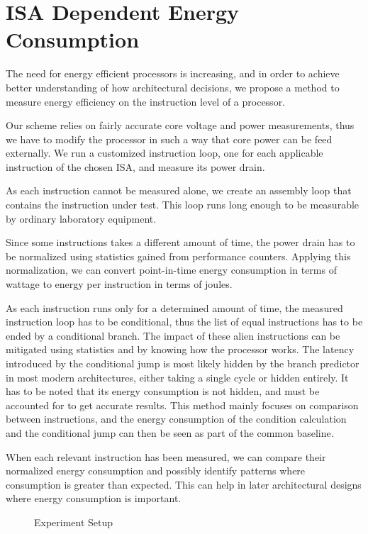 \section{ISA Dependent Energy Consumption}

The need for energy efficient processors is increasing, and in order to achieve
better understanding of how architectural decisions, we propose a method to
measure energy efficiency on the instruction level of a processor.

Our scheme relies on fairly accurate core voltage and power measurements, thus
we have to modify the processor in such a way that core power can be feed
externally.  We run a customized instruction loop, one for each applicable
instruction of the chosen ISA, and measure its power drain.

As each instruction cannot be measured alone, we create an assembly loop that
contains the instruction under test. This loop runs long enough to be measurable
by ordinary laboratory equipment.

Since some instructions takes a different amount of time, the power drain has to be
normalized using statistics gained from performance counters. Applying this
normalization, we can convert point-in-time energy consumption in terms of
wattage to energy per instruction in terms of joules.

As each instruction runs only for a determined amount of time, the measured
instruction loop has to be conditional, thus the list of equal instructions has
to be ended by a conditional branch. The impact of these alien instructions
can be mitigated using statistics and by knowing how the processor works. The
latency introduced by the conditional jump is most likely hidden by the branch
predictor in most modern architectures, either taking a single cycle or hidden
entirely. It has to be noted that its energy consumption is not hidden, and must
be accounted for to get accurate results. This method mainly focuses on
comparison between instructions, and the energy consumption of the condition
calculation and the conditional jump can then be seen as part of the common
baseline.

When each relevant instruction has been measured, we can compare their
normalized energy consumption and possibly identify patterns where consumption
is greater than expected. This can help in later architectural designs where
energy consumption is important.

\begin{figure}
    
    \caption{Experiment Setup}
    \label{fig:setup}
\end{figure}


